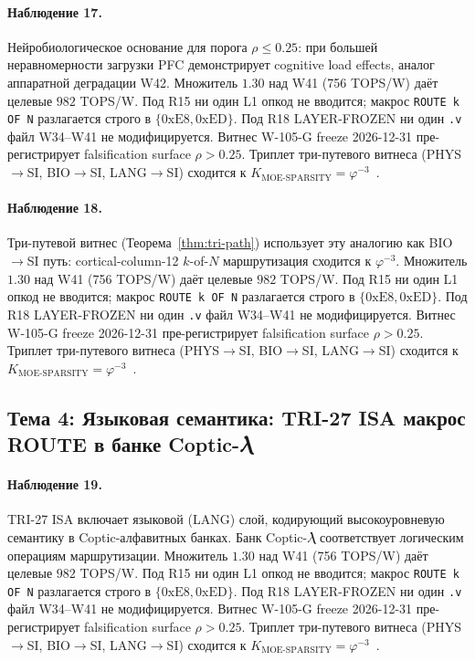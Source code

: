 \paragraph{Наблюдение 17.} Нейробиологическое основание для порога $\rho \leq 0{.}25$: при большей неравномерности загрузки PFC демонстрирует cognitive load effects, аналог аппаратной деградации W42. Множитель $1{.}30$ над W41 (756 TOPS/W) даёт целевые $982$ TOPS/W. Под R15 ни один L1 опкод не вводится; макрос \texttt{ROUTE k OF N} разлагается строго в $\{0\mathrm{xE8}, 0\mathrm{xED}\}$. Под R18 LAYER-FROZEN ни один \texttt{.v} файл W34--W41 не модифицируется. Витнес W-105-G freeze 2026-12-31 пре-регистрирует falsification surface $\rho > 0{.}25$. Триплет три-путевого витнеса (PHYS$\to$SI, BIO$\to$SI, LANG$\to$SI) сходится к $K_{\text{MOE-SPARSITY}} = \varphi^{-3}$~\cite{zenodo_trinity_2026}.

\paragraph{Наблюдение 18.} Три-путевой витнес (Теорема~\ref{thm:tri-path}) использует эту аналогию как BIO$\to$SI путь: cortical-column-12 $k$-of-$N$ маршрутизация сходится к $\varphi^{-3}$. Множитель $1{.}30$ над W41 (756 TOPS/W) даёт целевые $982$ TOPS/W. Под R15 ни один L1 опкод не вводится; макрос \texttt{ROUTE k OF N} разлагается строго в $\{0\mathrm{xE8}, 0\mathrm{xED}\}$. Под R18 LAYER-FROZEN ни один \texttt{.v} файл W34--W41 не модифицируется. Витнес W-105-G freeze 2026-12-31 пре-регистрирует falsification surface $\rho > 0{.}25$. Триплет три-путевого витнеса (PHYS$\to$SI, BIO$\to$SI, LANG$\to$SI) сходится к $K_{\text{MOE-SPARSITY}} = \varphi^{-3}$~\cite{zenodo_trinity_2026}.

\subsection{Тема 4: Языковая семантика: TRI-27 ISA макрос ROUTE в банке Coptic-\textit{Ⲗ}}

\paragraph{Наблюдение 19.} TRI-27 ISA включает языковой (LANG) слой, кодирующий высокоуровневую семантику в Coptic-алфавитных банках. Банк Coptic-\textit{Ⲗ} соответствует логическим операциям маршрутизации. Множитель $1{.}30$ над W41 (756 TOPS/W) даёт целевые $982$ TOPS/W. Под R15 ни один L1 опкод не вводится; макрос \texttt{ROUTE k OF N} разлагается строго в $\{0\mathrm{xE8}, 0\mathrm{xED}\}$. Под R18 LAYER-FROZEN ни один \texttt{.v} файл W34--W41 не модифицируется. Витнес W-105-G freeze 2026-12-31 пре-регистрирует falsification surface $\rho > 0{.}25$. Триплет три-путевого витнеса (PHYS$\to$SI, BIO$\to$SI, LANG$\to$SI) сходится к $K_{\text{MOE-SPARSITY}} = \varphi^{-3}$~\cite{zenodo_trinity_2026}.


